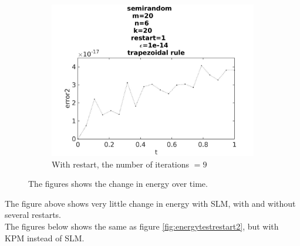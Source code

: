 \begin{figure}[H]
\begin{subfigure}[b]{0.3\textwidth}
                \includegraphics[width=\textwidth]{../MATLAB/fig/errortestrestart12.jpg}
                \caption{ With restart, the number of iterations $= 9$ }
                \label{fig:errortestrestart12}
        \end{subfigure}
        \caption{ The figures shows the change in energy over time.}
        \label{fig:energytestrestart2next}
\end{figure}
The figure above shows very little change in energy with SLM, with and without several restarts. \\

The figures below shows the same as figure \ref{fig:energytestrestart2}, but with KPM instead of SLM. 

